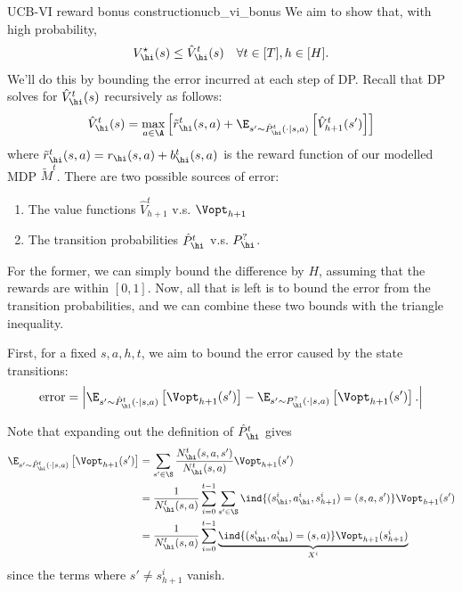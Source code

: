 \documentclass[\main/main]{subfiles}
\begin{document}
\begin{derivation}{UCB-VI reward bonus construction}{ucb_vi_bonus}
    We aim to show that, with high probability, \[
        V_\hi^\star(s) \le \hat{V}_\hi^t(s) \quad \forall t \in [T], h \in [H].
    \]
    We'll do this by bounding the error incurred at each step of DP. Recall that DP solves for $\hat{V}_\hi^t(s)$ recursively as follows:
    \[
        \hat{V}_\hi^t(s) = \max_{a \in \A} \left[ \tilde r^t_\hi(s, a) + \E_{s' \sim \hat{P}_\hi^t(\cdot \mid s, a)} \left[ \hat{V}_{h+1}^t(s') \right] \right]
    \]
    where $\tilde r^t_\hi(s, a) = r_\hi(s, a) + b_\hi^t(s, a)$ is the reward function of our modelled MDP $\tilde{M}^t$.
    There are two possible sources of error:
    \begin{enumerate}
        \item The value functions $\hat{V}^t_{h+1}$ v.s. $\Vopt_{h+1}$
        \item The transition probabilities $\hat{P}_\hi^t$ v.s. $P^?_\hi$.
    \end{enumerate}
    For the former, we can simply bound the difference by $H$, assuming that the rewards are within $[0, 1]$. Now, all that is left is to bound the error from the transition probabilities, and we can combine these two bounds with the triangle inequality.
    
    First, for a fixed $s, a, h, t$, we aim to bound the error caused by the state transitions:
    \begin{equation}
        \text{error} = \left| \E_{s' \sim \hat{P}_\hi^t(\cdot \mid s, a)} \left[ \Vopt_{h+1}(s') \right] - \E_{s' \sim P^?_\hi(\cdot \mid s, a)} \left[ \Vopt_{h+1}(s') \right]. \right|
        \label{eq:err}
    \end{equation}

    Note that expanding out the definition of $\hat{P}_\hi^t$ gives
    \begin{align*}
        \E_{s' \sim \hat{P}_\hi^t(\cdot \mid s, a)} \left[ \Vopt_{h+1}(s') \right] &= \sum_{s' \in \S} \frac{N^t_\hi(s, a, s')}{N^t_\hi(s, a)} \Vopt_{h+1}(s') \\
        &= \frac{1}{N^t_\hi(s, a)} \sum_{i=0}^{t-1} \sum_{s' \in \S} \ind{ (s_\hi^i, a_\hi^i, s_{h+1}^i) = (s, a, s') } \Vopt_{h+1}(s') \\
        &= \frac{1}{N^t_\hi(s, a)} \sum_{i=0}^{t-1} \underbrace{\ind{ (s_\hi^i, a_\hi^i) = (s, a) } \Vopt_{h+1}(s_{h+1}^i)}_{X^i}
    \end{align*}
    since the terms where $s' \neq s_{h+1}^i$ vanish.


\end{derivation}
\end{document}
